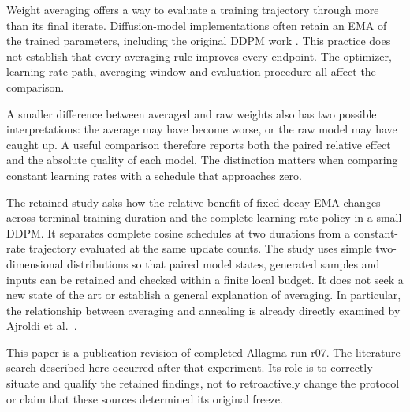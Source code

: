 Weight averaging offers a way to evaluate a training trajectory through more
than its final iterate. Diffusion-model implementations often retain an EMA of
the trained parameters, including the original DDPM work \cite{Ho2020}. This
practice does not establish that every averaging rule improves every endpoint.
The optimizer, learning-rate path, averaging window and evaluation procedure
all affect the comparison.

A smaller difference between averaged and raw weights also has two possible
interpretations: the average may have become worse, or the raw model may have
caught up. A useful comparison therefore reports both the paired relative
effect and the absolute quality of each model. The distinction matters when
comparing constant learning rates with a schedule that approaches zero.

The retained study asks how the relative benefit of fixed-decay EMA changes
across terminal training duration and the complete learning-rate policy in a
small DDPM. It separates complete cosine schedules at two durations from a
constant-rate trajectory evaluated at the same update counts. The study uses
simple two-dimensional distributions so that paired model states, generated
samples and inputs can be retained and checked within a finite local budget.
It does not seek a new state of the art or establish a general explanation of
averaging. In particular, the relationship between averaging and annealing is
already directly examined by Ajroldi et al.\ \cite{Ajroldi2025}.

This paper is a publication revision of completed Allagma run r07. The
literature search described here occurred after that experiment. Its role is to
correctly situate and qualify the retained findings, not to retroactively change
the protocol or claim that these sources determined its original freeze.
